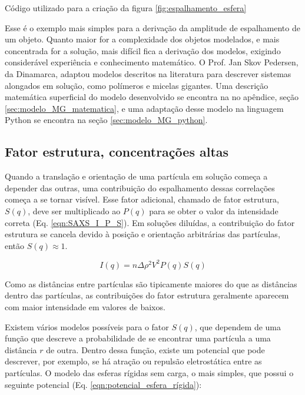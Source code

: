 		\begin{listing}[H]
			\inputminted{python}{./python/plot_saxs_esfera.py}
			\caption{Código utilizado para a criação da figura \ref{fig:espalhamento_esfera}}
			\label{lst:plot_micela_esferica}
		\end{listing}
		
		Esse é o exemplo mais simples para a derivação da amplitude de espalhamento de um objeto. Quanto maior for a complexidade dos objetos modelados, e mais concentrada for a solução, mais difícil fica a derivação dos modelos, exigindo considerável experiência e conhecimento matemático. O Prof. Jan Skov Pedersen, da Dinamarca, adaptou modelos descritos na literatura para descrever sistemas alongados em solução, como polímeros e micelas gigantes. Uma descrição matemática superficial do modelo desenvolvido se encontra na no apêndice, seção \ref{sec:modelo_MG_matematica}, e uma adaptação desse modelo na linguagem Python se encontra na seção \ref{sec:modelo_MG_python}.
		
		\subsection{Fator estrutura, concentrações altas}
		
		Quando a translação e orientação de uma partícula em solução começa a depender das outras, uma contribuição do espalhamento dessas correlações começa a se tornar visível. Esse fator adicional, chamado de fator estrutura, \(S(q)\), deve ser multiplicado ao \(P(q)\) para se obter o valor da intensidade correta (Eq. \ref{eqn:SAXS_I_P_S}). Em soluções diluídas, a contribuição do fator estrutura se cancela devido à posição e orientação arbitrárias das partículas, então \(S(q) \approx 1\).
		
		\begin{equation}
			I(q) = n\Delta \rho^2 V^2 P(q) S(q)
			\label{eqn:SAXS_I_P_S}
		\end{equation}
		
		Como as distâncias entre partículas são tipicamente maiores do que as distâncias dentro das partículas, as contribuições do fator estrutura geralmente aparecem com maior intensidade em valores de \q{} baixos.
		
		Existem vários modelos possíveis para o fator \(S(q)\), que dependem de uma função que descreve a probabilidade de se encontrar uma partícula a uma distância \(r\) de outra. Dentro dessa função, existe um potencial que pode descrever, por exemplo, se há atração ou repulsão eletrostática entre as partículas. O modelo das esferas rígidas sem carga, o mais simples, que possui o seguinte potencial (Eq. \ref{eqn:potencial_esfera_rígida}):
		
